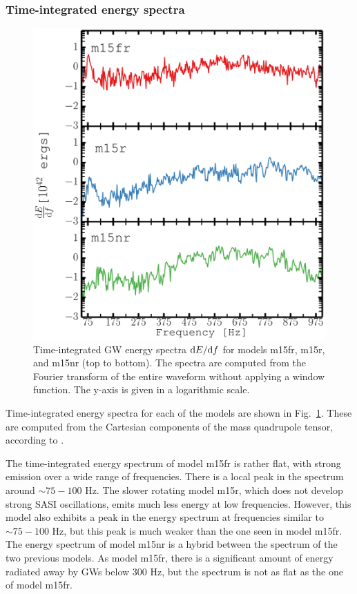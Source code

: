 \subsubsection{Time-integrated energy spectra}
\begin{figure}
\centering                            
\includegraphics[width=0.79\linewidth]{./images/paper2/dedv_rot.pdf}
\caption{Time-integrated GW energy spectra $\mathrm{d} E/ \mathrm{d} f$ for models m15fr,
m15r, and  m15nr (top to bottom). The spectra
are computed from the Fourier transform of the entire waveform
without applying a window function. The y-axis is given in a logarithmic scale.
\label{figp2:energy_spectra}}
\end{figure}
Time-integrated energy spectra for each of the models are shown
in Fig.~\ref{figp2:energy_spectra}. These are computed from
the Cartesian components of the mass quadrupole tensor, according to
.

The time-integrated energy spectrum of model m15fr is rather flat, with strong emission over a wide range of frequencies.
There is a local peak in the spectrum around $\sim 75-100$ Hz. The slower rotating model m15r, which does not
develop strong SASI oscillations, emits much less energy at low frequencies. However, this model also
exhibits a peak in the energy spectrum at frequencies similar to $\sim 75-100$ Hz, but
this peak is much weaker than the one seen in model m15fr.
The energy spectrum of model m15nr is a hybrid between the spectrum of the two previous models. 
As model m15fr, there is a significant amount of energy radiated away by GWs below 300 Hz, but the spectrum is not as flat as the one of model m15fr. 

